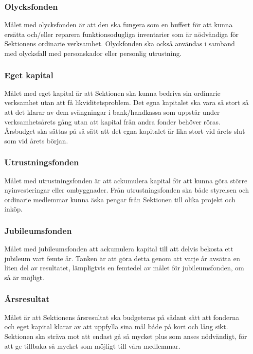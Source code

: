 \documentclass[10pt]{article}
\begin{document}
    \subsubsection*{Olycksfonden}
    Målet med olycksfonden är att den ska fungera som en buffert för att kunna ersätta och/eller reparera funktionsodugliga inventarier som är nödvändiga för Sektionens ordinarie verksamhet. Olyckfonden ska också användas i samband med olycksfall med personskador eller personlig utrustning.
    
    \subsubsection*{Eget kapital}
    Målet med eget kapital är att Sektionen ska kunna bedriva sin ordinarie verksamhet utan att få likviditetsproblem. Det egna kapitalet ska vara så stort så att det klarar av dem svängningar i bank/handkassa som uppstår under verksamhetsårets gång utan att kapital från andra fonder behöver röras. Årsbudget ska sättas på så sätt att det egna kapitalet är lika stort vid årets slut som vid årets början.
    
    \subsubsection*{Utrustningsfonden}
    Målet med utrustningsfonden är att ackumulera kapital för att kunna göra större nyinvesteringar eller ombyggnader. Från utrustningsfonden ska både styrelsen och ordinarie medlemmar kunna äska pengar från Sektionen till olika projekt och inköp.
    
    \subsubsection*{Jubileumsfonden}
    Målet med jubileumsfonden att ackumulera kapital till att delvis bekosta ett jubileum vart femte år. Tanken är att göra detta genom att varje år avsätta en liten del av resultatet, lämpligtvis en femtedel av målet för jubileumsfonden, om så är möjligt.
    
    \subsubsection*{Årsresultat}
    Målet är att Sektionens årsresultat ska budgeteras på sådant sätt att fonderna och eget kapital klarar av att uppfylla sina mål både på kort och lång sikt. Sektionen ska sträva mot att endast gå så mycket plus som anses nödvändigt, för att ge tillbaka så mycket som möjligt till våra medlemmar.
    
\end{document}
